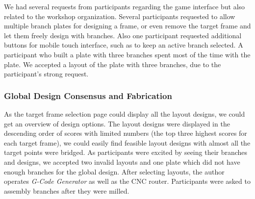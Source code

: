 We had several requests from participants regarding the game interface but also related to the workshop organization.
Several participants requested to allow multiple branch plates for designing a frame, or even remove the target frame and let them freely design with branches.
Also one participant requested additional buttons for mobile touch interface, such as to keep an active branch selected.
A participant who built a plate with three branches spent most of the time with the plate.
We accepted a layout of the plate with three branches, due to the participant's strong request.


\subsubsection*{Global Design Consensus and Fabrication}
As the target frame selection page could display all the layout designs, we could get an overview of design options.
The layout designs were displayed in the descending order of scores with limited numbers (the top three highest scores for each target frame), we could easily find feasible layout designs with almost all the target points were bridged.
As participants were excited by seeing their branches and designs, we accepted two invalid layouts and one plate which did not have enough branches for the global design.
%
After selecting layouts, the author operates \textit{G-Code Generator} as well as the CNC router.
Participants were asked to assembly branches after they were milled.

